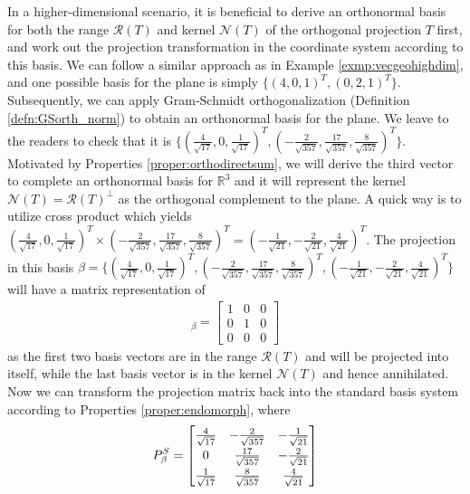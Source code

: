 \begin{solution}
In a higher-dimensional scenario, it is beneficial to derive an orthonormal basis for both the range $\mathcal{R}(T)$ and kernel $\mathcal{N}(T)$ of the orthogonal projection $T$ first, and work out the projection transformation in the coordinate system according to this basis. We can follow a similar approach as in Example \ref{exmp:vecgeohighdim}, and one possible basis for the plane is simply $\{(4,0,1)^T, (0,2,1)^T\}$. Subsequently, we can apply Gram-Schmidt orthogonalization (Definition \ref{defn:GSorth_norm}) to obtain an orthonormal basis for the plane. We leave to the readers to check that it is $\{(\frac{4}{\sqrt{17}}, 0, \frac{1}{\sqrt{17}})^T, (-\frac{2}{\sqrt{357}}, \frac{17}{\sqrt{357}}, \frac{8}{\sqrt{357}})^T\}$. Motivated by Properties \ref{proper:orthodirectsum}, we will derive the third vector to complete an orthonormal basis for $\mathbb{R}^3$ and it will represent the kernel $\mathcal{N}(T) = \mathcal{R}(T)^\perp$ as the orthogonal complement to the plane. A quick way is to utilize cross product which yields $(\frac{4}{\sqrt{17}}, 0, \frac{1}{\sqrt{17}})^T \times (-\frac{2}{\sqrt{357}}, \frac{17}{\sqrt{357}}, \frac{8}{\sqrt{357}})^T = (-\frac{1}{\sqrt{21}}, -\frac{2}{\sqrt{21}}, \frac{4}{\sqrt{21}})^T$. The projection in this basis $\beta = \{(\frac{4}{\sqrt{17}}, 0, \frac{1}{\sqrt{17}})^T, (-\frac{2}{\sqrt{357}}, \frac{17}{\sqrt{357}}, \frac{8}{\sqrt{357}})^T, (-\frac{1}{\sqrt{21}}, -\frac{2}{\sqrt{21}}, \frac{4}{\sqrt{21}})^T\}$ will have a matrix representation of
\begin{align*}
[T]_\beta = 
\begin{bmatrix}
1 & 0 & 0 \\
0 & 1 & 0 \\
0 & 0 & 0
\end{bmatrix}
\end{align*}
as the first two basis vectors are in the range $\mathcal{R}(T)$ and will be projected into itself, while the last basis vector is in the kernel $\mathcal{N}(T)$ and hence annihilated. Now we can transform the projection matrix back into the standard basis system according to Properties \ref{proper:endomorph}, where
\begin{align*}
P_\beta^S = 
\renewcommand\arraystretch{1.25}
\begin{bmatrix}
\frac{4}{\sqrt{17}} & -\frac{2}{\sqrt{357}} & -\frac{1}{\sqrt{21}} \\
0 & \frac{17}{\sqrt{357}} & -\frac{2}{\sqrt{21}} \\
\frac{1}{\sqrt{17}} & \frac{8}{\sqrt{357}} & \frac{4}{\sqrt{21}}

\end{bmatrix}
\end{align*}
\end{solution}
